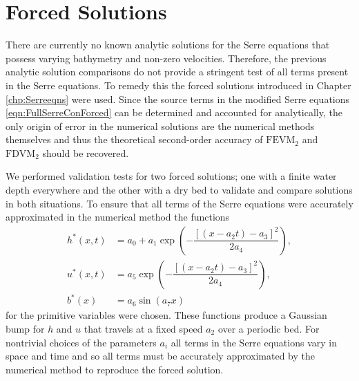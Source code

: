 
\section{Forced Solutions}
There are currently no known analytic solutions for the Serre equations that possess varying bathymetry and non-zero velocities. Therefore, the previous analytic solution comparisons do not provide a stringent test of all terms present in the Serre equations. To remedy this the forced solutions introduced in Chapter \ref{chp:Serreeqns} were used. Since the source terms in the modified Serre equations \eqref{eqn:FullSerreConForced} can be determined and accounted for analytically, the only origin of error in the numerical solutions are the numerical methods themselves and thus the theoretical second-order accuracy of $\text{FEVM}_2$ and $\text{FDVM}_2$ should be recovered. 

We performed validation tests for two forced solutions; one with a finite water depth everywhere and the other with a dry bed to validate and compare solutions in both situations. To ensure that all terms of the Serre equations were accurately approximated in the numerical method the functions
\begin{subequations}
\begin{align}
\label{eqn:ForcedSolutionxt}
h^*(x,t) &= a_0 + a_1 \exp\left(-\dfrac{\left[\left(x - a_2 t\right) - a_3\right]^2}{2 a_4}\right), \\
u^*(x,t) &= a_5 \exp\left(-\dfrac{\left[\left(x - a_2 t\right) - a_3\right]^2}{2 a_4}\right), \\
b^*(x) &= a_6 \sin\left(a_7 x\right)
\end{align}
\end{subequations}
for the primitive variables were chosen. These functions produce a Gaussian bump for $h$ and $u$ that travels at a fixed speed $a_2$ over a periodic bed. For nontrivial choices of the parameters $a_i$ all terms in the Serre equations vary in space and time and so all terms must be accurately approximated by the numerical method to reproduce the forced solution. 


